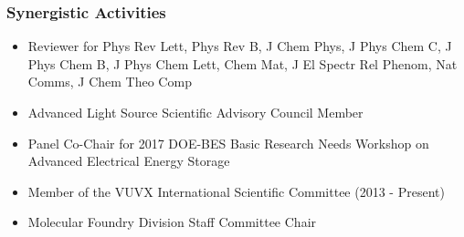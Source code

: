 \subsubsection*{Synergistic Activities}
\begin{itemize}
    \item Reviewer for Phys Rev Lett, Phys Rev B, J Chem Phys, J Phys Chem C, J Phys Chem B, J Phys Chem Lett, Chem Mat, J El Spectr Rel Phenom, Nat Comms, J Chem Theo Comp
    \item Advanced Light Source Scientific Advisory Council Member
    \item Panel Co-Chair for 2017 DOE-BES Basic Research Needs Workshop on Advanced Electrical Energy Storage
    \item Member of the VUVX International Scientific Committee (2013 - Present)
    \item Molecular Foundry Division Staff Committee Chair
\end{itemize}
\clearpage